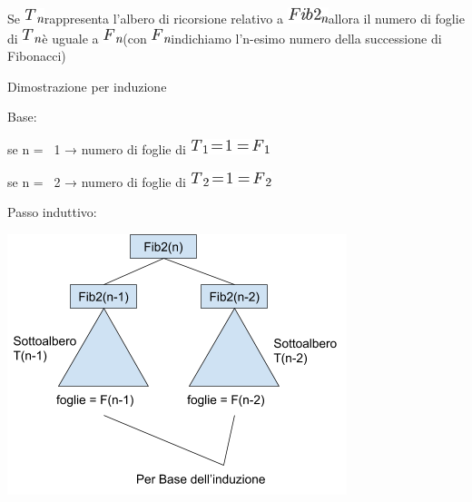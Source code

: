 \documentclass{article}
\begin{document}
{Se }\includegraphics{images/image23.png}{rappresenta l'albero di
ricorsione relativo a }\includegraphics{images/image34.png}{allora il
numero di foglie di }\includegraphics{images/image23.png}{è uguale a
}\includegraphics{images/image1.png}{(con
}\includegraphics{images/image1.png}{indichiamo l'n-esimo numero della
successione di Fibonacci)}

{}

{Dimostrazione per induzione}

{}

{Base:}

{se n = ~1 → numero di foglie di }\includegraphics{images/image35.png}

{se n = ~2 → numero di foglie di }\includegraphics{images/image36.png}

{}

{Passo induttivo:}

{\includegraphics{images/image528.png}}
\end{document}
